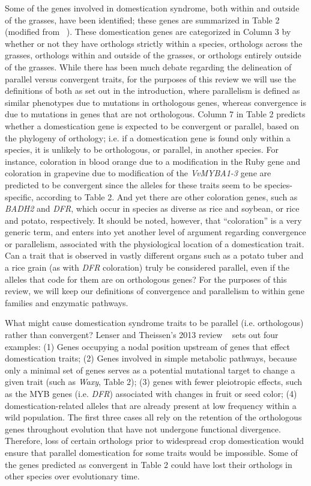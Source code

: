 \documentclass[12pt]{article}
\begin{document}
Some of the genes involved in domestication syndrome, both within and outside of the grasses, have been identified; these genes are summarized in Table 2 (modified from ~\cite{Lenser2013}). These domestication genes are categorized in Column 3 by whether or not they have orthologs strictly within a species, orthologs across the grasses, orthologs within and outside of the grasses, or orthologs entirely outside of the grasses. While there has been much debate regarding the delineation of parallel versus convergent traits, for the purposes of this review we will use the definitions of both as set out in the introduction, where parallelism is defined as similar phenotypes due to mutations in orthologous genes, whereas convergence is due to mutations in genes that are not orthologous. Column 7 in Table 2 predicts whether a domestication gene is expected to be convergent or parallel, based on the phylogeny of orthology; i.e. if a domestication gene is found only within a species, it is unlikely to be orthologous, or parallel, in another species. For instance, coloration in blood orange due to a modification in the Ruby gene and coloration in grapevine due to modification of the \textit{VvMYBA1-3} gene are predicted to be convergent since the alleles for these traits seem to be species-specific, according to Table 2. And yet there are other coloration genes, such as \textit{BADH2} and \textit{DFR}, which occur in species as diverse as rice and soybean, or rice and potato, respectively.  It should be noted, however, that “coloration” is a very generic term, and enters into yet another level of argument regarding convergence or parallelism, associated with the physiological location of a domestication trait. Can a trait that is observed in vastly different organs such as a potato tuber and a rice grain (as with \textit{DFR} coloration) truly be considered parallel, even if the alleles that code for them are on orthologous genes? For the purposes of this review, we will keep our definitions of convergence and parallelism to within gene families and enzymatic pathways. 

What might cause domestication syndrome traits to be parallel (i.e. orthologous) rather than convergent? Lenser and Theissen’s 2013 review ~\cite{Lenser2013} sets out four examples: (1) Genes occupying a nodal position upstream of genes that effect domestication traits; (2) Genes involved in simple metabolic pathways, because only a minimal set of genes serves as a potential mutational target to change a given trait (such as \textit{Waxy}, Table 2); (3) genes with fewer pleiotropic effects, such as the MYB genes (i.e. \textit{DFR}) associated with changes in fruit or seed color; (4) domestication-related alleles that are already present at low frequency within a wild population.  The first three cases all rely on the retention of the orthologous genes throughout evolution that have not undergone functional divergence. Therefore, loss of certain orthologs prior to widespread crop domestication would ensure that parallel domestication for some traits would be impossible.  Some of the genes predicted as convergent in Table 2 could have lost their orthologs in other species over evolutionary time.
\end{document}
